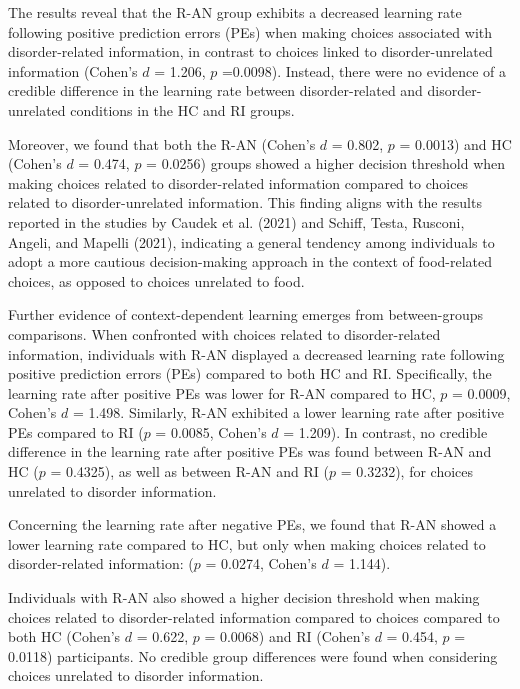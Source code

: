 \documentclass[
  man,floatsintext]{apa6}
\begin{document}
The results reveal that the R-AN group exhibits a decreased learning rate following positive prediction errors (PEs) when making choices associated with disorder-related information, in contrast to choices linked to disorder-unrelated information (Cohen's \(d\) = 1.206, \(p\) =0.0098). Instead, there were no evidence of a credible difference in the learning rate between disorder-related and disorder-unrelated conditions in the HC and RI groups.

Moreover, we found that both the R-AN (Cohen's \(d\) = 0.802, \(p\) = 0.0013) and HC (Cohen's \(d\) = 0.474, \(p\) = 0.0256) groups showed a higher decision threshold when making choices related to disorder-related information compared to choices related to disorder-unrelated information. This finding aligns with the results reported in the studies by Caudek et al. (2021) and Schiff, Testa, Rusconi, Angeli, and Mapelli (2021), indicating a general tendency among individuals to adopt a more cautious decision-making approach in the context of food-related choices, as opposed to choices unrelated to food.

Further evidence of context-dependent learning emerges from between-groups comparisons. When confronted with choices related to disorder-related information, individuals with R-AN displayed a decreased learning rate following positive prediction errors (PEs) compared to both HC and RI. Specifically, the learning rate after positive PEs was lower for R-AN compared to HC, \(p\) = 0.0009, Cohen's \(d\) = 1.498. Similarly, R-AN exhibited a lower learning rate after positive PEs compared to RI (\(p\) = 0.0085, Cohen's \(d\) = 1.209). In contrast, no credible difference in the learning rate after positive PEs was found between R-AN and HC (\(p\) = 0.4325), as well as between R-AN and RI (\(p\) = 0.3232), for choices unrelated to disorder information.

Concerning the learning rate after negative PEs, we found that R-AN showed a lower learning rate compared to HC, but only when making choices related to disorder-related information: (\(p\) = 0.0274, Cohen's \(d\) = 1.144).

Individuals with R-AN also showed a higher decision threshold when making choices related to disorder-related information compared to choices compared to both HC (Cohen's \(d\) = 0.622, \(p\) = 0.0068) and RI (Cohen's \(d\) = 0.454, \(p\) = 0.0118) participants. No credible group differences were found when considering choices unrelated to disorder information.
\end{document}
